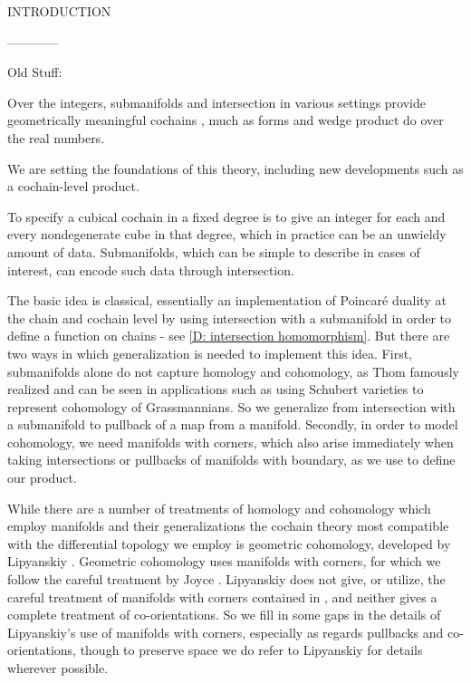 
INTRODUCTION

------------

Old Stuff:


Over the integers, submanifolds and intersection in various settings provide geometrically meaningful cochains \cite{Lipy14, Joyc15},
much as forms and wedge product do over the real numbers.

We are setting the foundations of this theory, including new developments such as a cochain-level product.

To specify a cubical  cochain in a fixed degree is to give an integer for each and every {nondegenerate cube} in that degree,
which in practice can be an unwieldy amount of data.
Submanifolds, which can be simple to describe in cases of interest, can encode such data through intersection.

The basic idea is classical, essentially an implementation of Poincar\'e duality at the chain and cochain level by using intersection with a
submanifold in order to define a function on chains - see \cref{D: intersection homomorphism}.
But there are two ways in which  generalization is needed to implement this idea.
First, submanifolds alone do not capture homology and cohomology, as Thom famously realized and can be
seen in applications such as using Schubert varieties to represent cohomology of Grassmannians.
So we generalize from intersection with a submanifold to pullback of a map from a manifold.
Secondly, in order to model cohomology, we need manifolds with corners, which also arise immediately when taking intersections or pullbacks of manifolds with boundary, as we use to define our product.

While there are a number of treatments of homology and cohomology which employ manifolds and their
generalizations \cite{Whit47, BRS76,  FeSj83, Krec10,  Kahn01, Zing08, Joyc15} the cochain theory most compatible with the differential topology we employ is geometric cohomology, developed by Lipyanskiy \cite{Lipy14}.
Geometric cohomology uses manifolds with corners, for which we follow the careful treatment by Joyce \cite{Joy12}.
Lipyanskiy does not give, or utilize, the careful treatment of manifolds with corners contained in \cite{Joy12}, and neither gives a complete treatment of co-orientations.
So we fill in some gaps in the details of Lipyanskiy's use of manifolds with corners, especially as regards pullbacks and co-orientations, though to preserve space we do refer to Lipyanskiy for details wherever possible.

